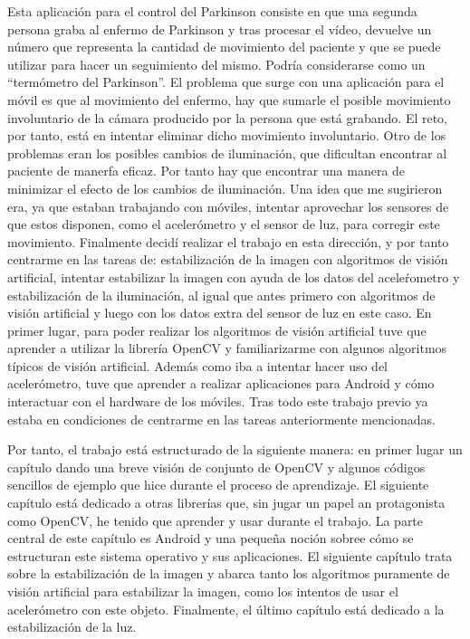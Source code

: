 \documentclass[a4paper,openright, 12pt]{book}
\begin{document}
Esta aplicación para el control del Parkinson consiste en que una segunda persona graba al enfermo de Parkinson y tras procesar el vídeo, devuelve un número que representa la cantidad de movimiento del paciente y que se puede utilizar para hacer un seguimiento del mismo. Podría considerarse como un ``termómetro del Parkinson''. El problema que surge con una aplicación para el móvil es que al movimiento del enfermo, hay que sumarle el posible movimiento involuntario de la cámara producido por la persona que está grabando. El reto, por tanto, está en intentar eliminar dicho movimiento involuntario. Otro de los problemas eran los posibles cambios de iluminación, que dificultan encontrar al paciente de manerfa eficaz. Por tanto hay que encontrar una manera de minimizar el efecto de los cambios de iluminación.
Una idea que me sugirieron era, ya que estaban trabajando con móviles, intentar aprovechar los sensores de que estos disponen, como el acelerómetro y el sensor de luz, para corregir este  movimiento.
\newpage
Finalmente decidí realizar el trabajo en esta dirección, y por tanto centrarme en las tareas de: estabilización de la imagen con algoritmos de visión artificial, intentar estabilizar la imagen con ayuda de los datos del aceleŕometro y estabilización de la iluminación, al igual que antes primero con algoritmos de visión artificial y luego con los datos extra del sensor de luz en este caso.
En primer lugar, para poder realizar los algoritmos de visión artificial tuve que aprender a utilizar la librería OpenCV\cite{opencvrefman} y familiarizarme con algunos algoritmos típicos de visión artificial. Además como iba a intentar hacer uso del acelerómetro, tuve que aprender a realizar aplicaciones para Android y cómo interactuar con el hardware de los móviles. Tras todo este trabajo previo ya estaba en condiciones de centrarme en las tareas anteriormente mencionadas.

Por tanto, el trabajo está estructurado de la siguiente manera: en primer lugar un capítulo dando una breve visión de conjunto de OpenCV y algunos
códigos sencillos de ejemplo que hice durante el proceso de aprendizaje.
El siguiente capítulo está dedicado a otras librerías que, sin jugar un papel
an protagonista como OpenCV, he tenido que aprender y usar durante el
trabajo. La parte central de este capítulo es Android y una pequeña noción
sobree cómo se estructuran este sistema operativo y sus aplicaciones.
El siguiente capítulo trata sobre la estabilización de la imagen y abarca tanto los algoritmos puramente de visión artificial para estabilizar la imagen, como los intentos de usar el acelerómetro con este objeto. Finalmente, el último capítulo está dedicado a la estabilización de la luz.
\newline
\end{document}
